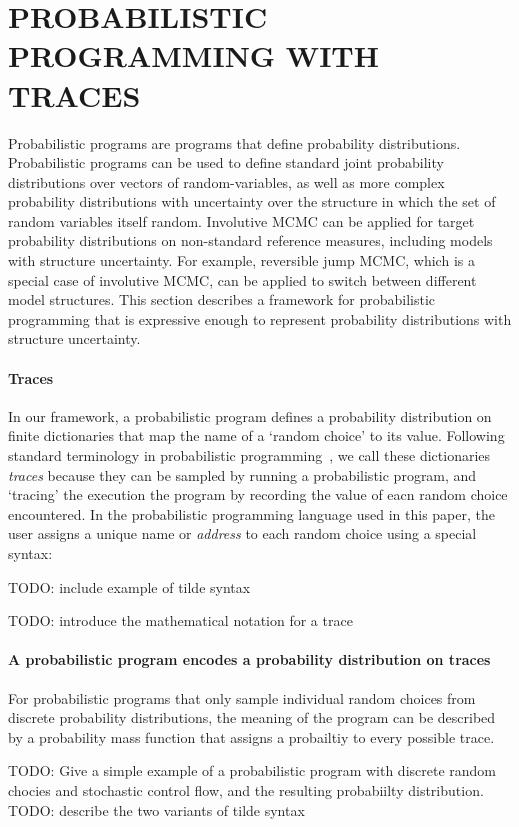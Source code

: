 \documentclass[twoside]{article}
\begin{document}
\section{PROBABILISTIC PROGRAMMING WITH TRACES}

Probabilistic programs are programs that define probability distributions.
Probabilistic programs can be used to define standard joint probability distributions over vectors of random-variables, as well as more complex probability distributions with uncertainty over the structure in which the set of random variables itself random.
Involutive MCMC can be applied for target probability distributions on non-standard reference measures, including models with structure uncertainty.
For example, reversible jump MCMC, which is a special case of involutive MCMC, can be applied to switch between different model structures.
This section describes a framework for probabilistic programming that is expressive enough to represent probability distributions with structure uncertainty.

\paragraph{Traces}
In our framework, a probabilistic program defines a probability distribution on finite dictionaries that map the name of a `random choice' to its value.
Following standard terminology in probabilistic programming~\citep{?}, we call these dictionaries \emph{traces} because they can be sampled by running a probabilistic program, and `tracing' the execution the program by recording the value of eacn random choice encountered.
In the probabilistic programming language used in this paper, the user assigns a unique name or \emph{address} to each random choice using a special syntax:

TODO: include example of tilde syntax

TODO: introduce the mathematical notation for a trace

\paragraph{A probabilistic program encodes a probability distribution on traces}
For probabilistic programs that only sample individual random choices from discrete probability distributions, the meaning of the program can be described by a probability mass function that assigns a probailtiy to every possible trace.

TODO: Give a simple example of a probabilistic program with discrete random chocies and stochastic control flow, and the resulting probabiilty distribution.
TODO: describe the two variants of tilde syntax
\end{document}
